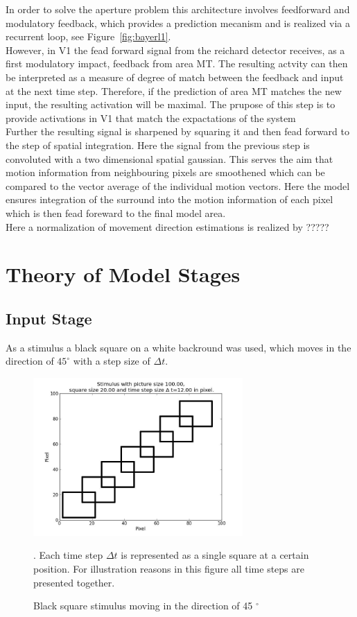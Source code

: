 \documentclass[a4paper]{article}
\begin{document}
In order to solve the aperture problem this architecture involves feedforward and modulatory feedback, which provides a prediction mecanism and is realized via a recurrent loop, see Figure~\ref{fig:bayerl1}.\\
However, in V1 the fead forward signal from the reichard detector receives, as a first modulatory impact, feedback from area MT. The resulting actvity can then be interpreted as a measure of degree of match between the feedback and input at the next time step. Therefore, if the prediction of area MT matches the new input, the resulting activation will be maximal. The prupose of this step is to provide activations in V1 that match the expactations of the system\\
Further the resulting signal is sharpened by squaring it and then fead forward to the step of spatial integration. Here the signal from the previous step is convoluted with a two dimensional spatial gaussian. This serves the aim that motion information from neighbouring pixels are smoothened which can be compared to the vector average of the individual motion vectors. Here the model ensures integration of the surround into the motion information of each pixel which is then fead foreward to the final model area.\\
Here a normalization of movement direction estimations is realized by ?????

\section{Theory of Model Stages}
\subsection{Input Stage}
As a stimulus a black square on a white backround was used, which moves in the direction of $45^{\circ}$ with a step size of $\Delta t$.

\vspace{0.5cm}
\begin{figure}[ht]
\centering
\includegraphics[width=8cm]{pics/stimulus}
\caption{Black square stimulus moving in the direction of 45 $^{\circ}$}. Each time step $\Delta t$ is represented as a single square at a certain position. For illustration reasons in this figure all time steps are presented together.
\label{fig:stimulus}
\end{figure}
\vspace{0.5cm}
\end{document}
